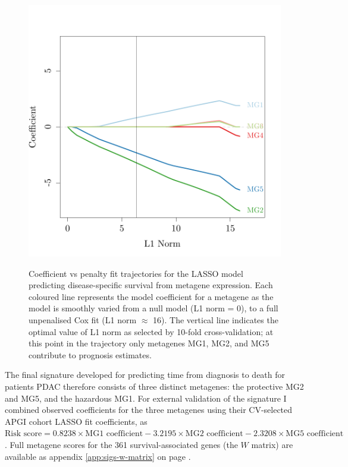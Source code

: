 \documentclass[dissertation.tex]{subfiles}
\begin{document}
\begin{figure}
\centering
\includegraphics[width=.7\linewidth]{analysis/biosurv/reports/18_SIS_diag_dsd_final/figure/nmf-metagene-glmnet-plots-2}
\label{fig:sigs-resub-lasso-track}
\caption{Coefficient vs penalty fit trajectories for the \acrshort{LASSO} model predicting disease-specific survival from metagene expression.  Each coloured line represents the model coefficient for a metagene as the model is smoothly varied from a null model (L1 norm = 0), to a full unpenalised Cox fit (L1 norm $\approx$ 16).  The vertical line indicates the optimal value of L1 norm as selected by 10-fold cross-validation; at this point in the trajectory only metagenes MG1, MG2, and MG5 contribute to prognosis estimates.}
\end{figure}

The final signature developed for predicting time from diagnosis to death for patients \gls{PDAC} therefore consists of three distinct metagenes: the protective MG2 and MG5, and the hazardous MG1.  For external validation of the signature I combined observed coefficients for the three metagenes using their CV-selected \gls{APGI} cohort \gls{LASSO} fit coefficients, as $\text{Risk score} = 0.8238 \times \text{MG1 coefficient} - 3.2195 \times \text{MG2 coefficient} - 2.3208 \times \text{MG5 coefficient}$.  Full metagene scores for the 361 survival-associated genes (the $W$ matrix) are available as appendix \ref{app:sigs-w-matrix} on page \pageref{app:sigs-w-matrix}.
\end{document}
